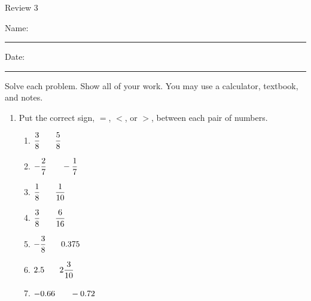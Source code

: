 \documentclass[12pt]{article}
\begin{document}
\pagestyle{empty} %
\begin{center}
          Review 3  \\[0.5in]
\end{center}
Name: \rule{4in}{0.005in} Date: \rule{1.5in}{0.005in} 
  \vspace{0.25in}
Solve each problem. Show all of your work. You may use a calculator, textbook, and notes.

\begin{enumerate}
\item Put the correct sign, $=$, $<$, or $>$, between each pair of numbers. 

\begin{multicols}{2}
\begin{enumerate}

  \item \hspace{0.25in} $\dfrac{3}{8} \hspace{0.25in} \dfrac{5}{8}$
  \vspace{0.25in}

  \item \hspace{0.25in} $-\dfrac{2}{7} \hspace{0.25in} -\dfrac{1}{7}$
  \vspace{0.25in}

  \item \hspace{0.25in} $\dfrac{1}{8} \hspace{0.25in} \dfrac{1}{10}$
  \vspace{0.25in}

  \item \hspace{0.25in} $\dfrac{3}{8} \hspace{0.25in} \dfrac{6}{16}$
  \vspace{0.25in}

  \item \hspace{0.25in} $-\dfrac{3}{8} \hspace{0.25in} 0.375$
  \vspace{0.25in}

  \item \hspace{0.25in} $2.5 \hspace{0.25in} 2\dfrac{3}{10}$
  \vspace{0.25in}

  \item \hspace{0.25in} $-0.66 \hspace{0.25in} -0.72$
  \vspace{0.25in}


\end{enumerate}
\end{multicols}
\end{enumerate}
\end{document}
